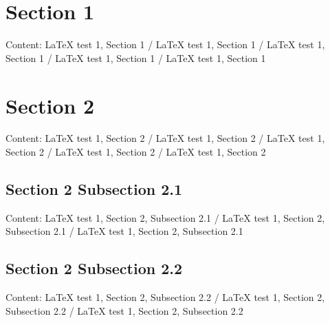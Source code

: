 \section{Section 1}\label{latex-test-1-section-1-headline}

Content: LaTeX test 1, Section 1 / LaTeX test 1, Section 1 / LaTeX test 1, Section 1 / LaTeX test 1, Section 1 / LaTeX test 1, Section 1

\section{Section 2}\label{latex-test-1-section-2-headline}

Content: LaTeX test 1, Section 2 / LaTeX test 1, Section 2 / LaTeX test 1, Section 2 / LaTeX test 1, Section 2 / LaTeX test 1, Section 2

\subsection{Section 2 Subsection 2.1}\label{latex-test-1-section-2-subsection-2-1-headline}

Content: LaTeX test 1, Section 2, Subsection 2.1 / LaTeX test 1, Section 2, Subsection 2.1 / LaTeX test 1, Section 2, Subsection 2.1

\subsection{Section 2 Subsection 2.2}\label{latex-test-1-section-2-subsection-2-2-headline}

Content: LaTeX test 1, Section 2, Subsection 2.2 / LaTeX test 1, Section 2, Subsection 2.2 / LaTeX test 1, Section 2, Subsection 2.2
